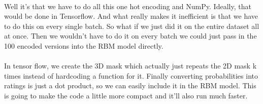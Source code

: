\documentclass{cup-pan}
\begin{document}
\paragraph{}
Well it's that we have to do all this one hot encoding and NumPy. Ideally, that would be done in Tensorflow. And what really makes it inefficient is that we have to do this on every single batch. So what if we just did it on the entire dataset all at once. Then we wouldn't have to do it on every batch we could just pass in the 100 encoded versions into the RBM model directly.
\paragraph{}
In tensor flow, we create the 3D mask which actually just repeats the 2D mask k times instead of hardcoding a function for it. Finally converting probabilities into ratings is just a dot product, so we can easily include it in the RBM model. This is going to make the code a little more compact and it'll also run much faster.
\end{document}
